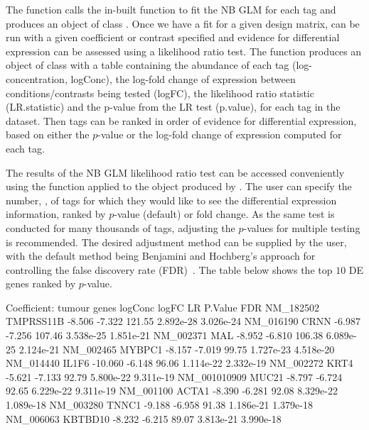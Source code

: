 The function  calls the in-built function
 to fit the NB GLM for each tag and produces an
object of class . Once we have a fit for a given design
matrix,  can be run with a given coefficient or
contrast specified and evidence for differential expression can be
assessed using a likelihood ratio test. The  function
produces an object of class  with a table containing
the abundance of each tag (log-concentration, logConc), the log-fold
change of expression between conditions/contrasts being tested
(logFC), the likelihood ratio statistic (LR.statistic) and the p-value
from the LR test (p.value), for each tag in the dataset. Then tags can
be ranked in order of evidence for differential expression, based on
either the $p$-value or the log-fold change of expression computed for
each tag.

The results of the NB GLM likelihood ratio test can be accessed
conveniently using the  function applied to the object
produced by . The user can specify the number,
, of tags for which they would like to see the differential
expression information, ranked by $p$-value (default) or fold
change. As the same test is conducted for many thousands of tags,
adjusting the $p$-values for multiple testing is recommended. The
desired adjustment method can be supplied by the user, with the
default method being Benjamini and Hochberg's approach for controlling
the false discovery rate (FDR)~\citep{Benjamini95}. The table below
shows the top $10$ DE genes ranked by $p$-value.

\begin{Schunk}
\begin{Soutput}
Coefficient:  tumour 
                 genes logConc  logFC     LR   P.Value       FDR
NM_182502    TMPRSS11B  -8.506 -7.322 121.55 2.892e-28 3.026e-24
NM_016190         CRNN  -6.987 -7.256 107.46 3.538e-25 1.851e-21
NM_002371          MAL  -8.952 -6.810 106.38 6.089e-25 2.124e-21
NM_002465       MYBPC1  -8.157 -7.019  99.75 1.727e-23 4.518e-20
NM_014440        IL1F6 -10.060 -6.148  96.06 1.114e-22 2.332e-19
NM_002272         KRT4  -5.621 -7.133  92.79 5.800e-22 9.311e-19
NM_001010909     MUC21  -8.797 -6.724  92.65 6.229e-22 9.311e-19
NM_001100        ACTA1  -8.390 -6.281  92.08 8.329e-22 1.089e-18
NM_003280        TNNC1  -9.188 -6.958  91.38 1.186e-21 1.379e-18
NM_006063      KBTBD10  -8.232 -6.215  89.07 3.813e-21 3.990e-18
\end{Soutput}
\end{Schunk}

